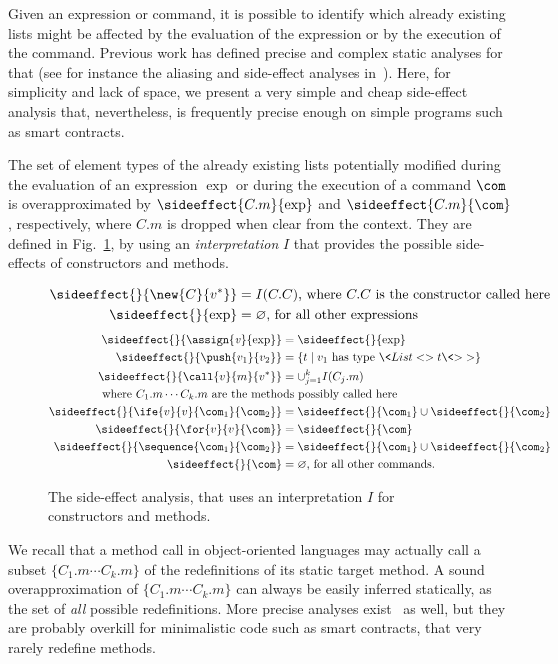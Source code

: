 Given an expression or command, it is possible to identify
which already existing lists might be affected by the evaluation of the expression
or by the execution of the command.
Previous work has defined precise and complex static analyses for that
(see for instance the aliasing and side-effect analyses in~\cite{SpotoMP10}).
Here, for simplicity and lack of space,
we present a very simple and cheap side-effect analysis that, nevertheless,
is frequently precise enough on simple programs such as smart contracts.
%
\begin{definition}\label{def:side_effect}
  The set of element types of the already existing lists potentially modified during the evaluation of an
  expression $\exp$ or during the execution of a command $\com$
  is overapproximated by $\sideeffect{C.m}{\exp}$ and $\sideeffect{C.m}{\com}$, respectively,
  where $C.m$ is dropped when clear from the context.
  They are defined in Fig.~\ref{fig:side_effect}, by using an \emph{interpretation} $I$ that
  provides the possible side-effects of constructors and methods.
  \begin{figure}[t]
  \begin{align*}
    \sideeffect{}{\new{C}{v^*}}&=I(C.C)\text{, where $C.C$ is the constructor called here}\\
    \sideeffect{}{\exp}&=\varnothing\text{, for all other expressions}
  \end{align*}
  \begin{align*}
    \sideeffect{}{\assign{\mathit{v}}{\exp}}&=\sideeffect{}{\exp}\\
    \sideeffect{}{\push{v_1}{v_2}}&=\{t\mid v_1\text{ has type }\<List<>t\<\text{>}>\}\\
    \sideeffect{}{\call{v}{m}{v^*}}&=\cup_{j=1}^k I(C_j.m)\\
    \noalign{\centering\text{where $C_1.m\cdots C_k.m$ are the methods possibly called here}}
    \sideeffect{}{\ife{v}{v}{\com_1}{\com_2}}&=\sideeffect{}{\com_1}\cup\sideeffect{}{\com_2}\\
    \sideeffect{}{\for{v}{v}{\com}}&=\sideeffect{}{\com}\\
    \sideeffect{}{\sequence{\com_1}{\com_2}}&=\sideeffect{}{\com_1}\cup\sideeffect{}{\com_2}\\
    \sideeffect{}{\com}&=\varnothing\text{, for all other commands.}
  \end{align*}
  \caption{The side-effect analysis, that uses an interpretation $I$ for constructors and methods.}
  \label{fig:side_effect}
  \end{figure}
\end{definition}
%
We recall that a method call in object-oriented languages may actually call a subset
$\{C_1.m\cdots C_k.m\}$ of the redefinitions of its static target method.
A sound overapproximation of $\{C_1.m\cdots C_k.m\}$ can always be easily inferred statically,
as the set of \emph{all} possible redefinitions. More precise analyses exist~\cite{TipP00} as well,
but they are probably overkill for minimalistic code such as smart contracts,
that very rarely redefine methods.

